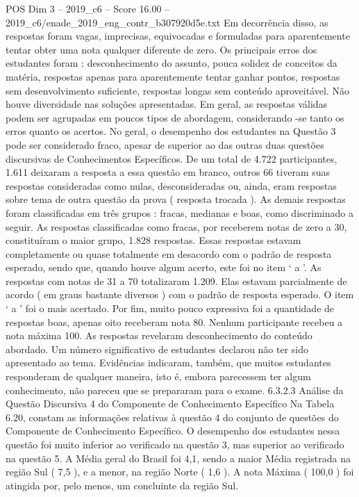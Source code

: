 \begin{textsample}{POS Dim 3 – 2019\_c6 – Score 16.00 – 2019\_c6/enade\_2019\_eng\_contr\_b307920d5e.txt}
Em decorrência disso, as respostas foram vagas, imprecisas, equivocadas e formuladas para aparentemente tentar obter uma nota qualquer diferente de zero.
Os principais erros dos estudantes foram : desconhecimento do assunto, pouca solidez de conceitos da matéria, respostas apenas para aparentemente tentar ganhar pontos, respostas sem desenvolvimento suficiente, respostas longas sem conteúdo aproveitável.
Não houve diversidade nas soluções apresentadas.
Em geral, as respostas válidas podem ser agrupadas em poucos tipos de abordagem, considerando -se tanto os erros quanto os acertos.
No geral, o desempenho dos estudantes na Questão 3 pode ser considerado fraco, apesar de superior ao das outras duas questões discursivas de Conhecimentos Específicos.
De um total de 4.722 participantes, 1.611 deixaram a resposta a essa questão em branco, outros 66 tiveram suas respostas consideradas como nulas, desconsideradas ou, ainda, eram respostas sobre tema de outra questão da prova ( resposta trocada ).
As demais respostas foram classificadas em três grupos : fracas, medianas e boas, como discriminado a seguir.
As respostas classificadas como fracas, por receberem notas de zero a 30, constituíram o maior grupo, 1.828 respostas.
Essas respostas estavam completamente ou quase totalmente em desacordo com o padrão de resposta esperado, sendo que, quando houve algum acerto, este foi no item ‘ a ’.
As respostas com notas de 31 a 70 totalizaram 1.209.
Elas estavam parcialmente de acordo ( em graus bastante diversos ) com o padrão de resposta esperado.
O item ‘ a ’ foi o mais acertado.
Por fim, muito pouco expressiva foi a quantidade de respostas boas, apenas oito receberam nota 80.
Nenhum participante recebeu a nota máxima 100.
As respostas revelaram desconhecimento do conteúdo abordado.
Um número significativo de estudantes declarou não ter sido apresentado ao tema.
Evidências indicaram, também, que muitos estudantes responderam de qualquer maneira, isto é, embora parecessem ter algum conhecimento, não pareceu que se prepararam para o exame. 6.3.2.3 Análise da Questão Discursiva 4 do Componente de Conhecimento Específico Na Tabela 6.20, constam as informações relativas à questão 4 do conjunto de questões do Componente de Conhecimento Específico.
O desempenho dos estudantes nessa questão foi muito inferior ao verificado na questão 3, mas superior ao verificado na questão 5.
A Média geral do Brasil foi 4,1, sendo a maior Média registrada na região Sul ( 7,5 ), e a menor, na região Norte ( 1,6 ).
A nota Máxima ( 100,0 ) foi atingida por, pelo menos, um concluinte da região Sul.

\end{textsample}
